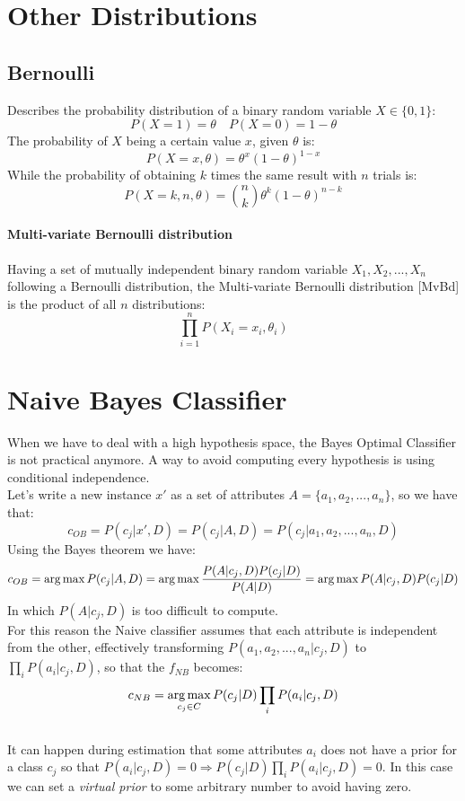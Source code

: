 \section{Other Distributions}

\subsection{Bernoulli}
Describes the probability distribution of a binary random variable $X \in \lbrace 0,1 \rbrace$:
\[P(X=1)=\theta \quad P(X=0)=1-\theta\]
The probability of $X$ being a certain value $x$, given $\theta$ is:
\[P(X=x,\theta)=\theta^x(1-\theta)^{1-x}\]
While the probability of obtaining $k$ times the same result with $n$ trials is:
\[P(X=k,n,\theta)=\binom{n}{k} \theta^k(1-\theta)^{n-k}\]

\paragraph{Multi-variate Bernoulli distribution}
Having a set of mutually independent binary random variable $X_1,X_2,...,X_n$ following a Bernoulli distribution, the Multi-variate Bernoulli distribution [MvBd] is the product of all $n$ distributions:
\[\prod_{i=1}^n P(X_i=x_i,\theta_i)\]


\section{Naive Bayes Classifier}
When we have to deal with a high hypothesis space, the Bayes Optimal Classifier  is not practical anymore. A way to avoid computing every hypothesis is using conditional independence.\\
Let's write a new instance $x'$ as a set of attributes $A=\lbrace a_1,a_2,...,a_n\rbrace$, so we have that:
\[c_{OB}=P(c_j| x',D)=P(c_j| A,D)=P(c_j| a_1,a_2,...,a_n,D)\]
Using the Bayes theorem we have:
\[c_{OB}=\operatorname*{arg\,max} P(c_j| A,D)=\operatorname*{arg\,max} \frac{P(A|c_j,D)P(c_j|D)}{P(A|D)}=\operatorname*{arg\,max} P(A|c_j,D)P(c_j|D)\]
In which $P(A|c_j,D)$ is too difficult to compute.\\
For this reason the Naive classifier assumes that each attribute is independent from the other, effectively transforming $P(a_1,a_2,...,a_n|c_j,D)$ to $\prod_i P(a_i|c_j,D)$, so that the $f_{NB}$ becomes:
\[c_{NB}=\operatorname*{arg\,max}_{c_j \in C} P(c_j|D)\prod_i P(a_i|c_j,D)\]\\

It can happen during estimation that some attributes $a_i$ does not have a prior for a class $c_j$ so that $P(a_i|c_j,D)=0 \Rightarrow P(c_j|D)\prod_i P(a_i|c_j,D)=0$. In this case we can set a \textit{virtual prior} to some arbitrary number to avoid having zero.

